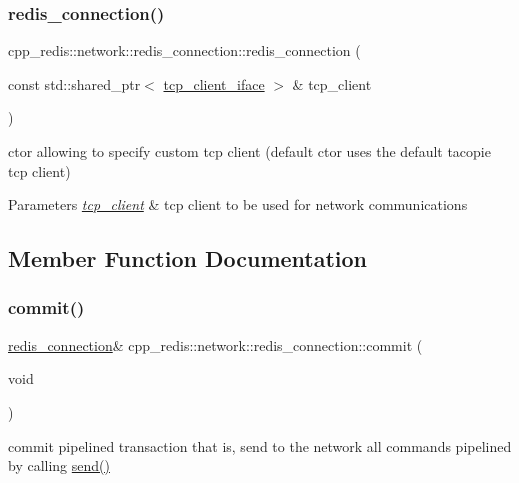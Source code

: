 \subsubsection{\texorpdfstring{redis\+\_\+connection()}{redis\_connection()}}
{\footnotesize\ttfamily cpp\+\_\+redis\+::network\+::redis\+\_\+connection\+::redis\+\_\+connection (\begin{DoxyParamCaption}\item[{const std\+::shared\+\_\+ptr$<$ \hyperlink{classcpp__redis_1_1network_1_1tcp__client__iface}{tcp\+\_\+client\+\_\+iface} $>$ \&}]{tcp\+\_\+client }\end{DoxyParamCaption})\hspace{0.3cm}{\ttfamily [explicit]}}

ctor allowing to specify custom tcp client (default ctor uses the default tacopie tcp client)


\begin{DoxyParams}{Parameters}
{\em \hyperlink{classcpp__redis_1_1network_1_1tcp__client}{tcp\+\_\+client}} & tcp client to be used for network communications \\
\hline
\end{DoxyParams}


\subsection{Member Function Documentation}
\mbox{\label{classcpp__redis_1_1network_1_1redis__connection_a8e6980d40139877c16e995051b780d60}} 
\subsubsection{\texorpdfstring{commit()}{commit()}}
{\footnotesize\ttfamily \hyperlink{classcpp__redis_1_1network_1_1redis__connection}{redis\+\_\+connection}\& cpp\+\_\+redis\+::network\+::redis\+\_\+connection\+::commit (\begin{DoxyParamCaption}\item[{void}]{ }\end{DoxyParamCaption})}

commit pipelined transaction that is, send to the network all commands pipelined by calling \hyperlink{classcpp__redis_1_1network_1_1redis__connection_a98c163ce431e85e46e139211564b7b3f}{send()}

